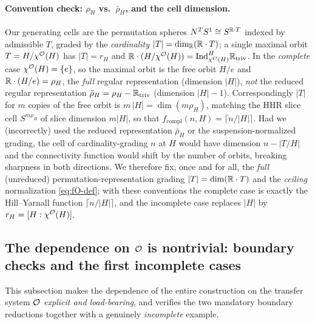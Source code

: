 \paragraph{Convention check: $\rho_H$ vs.\ $\bar\rho_H$, and the cell dimension.}
Our generating cells are the permutation spheres $N^{T}S^1\cong S^{\mathbb{R}\cdot T}$
indexed by admissible $T$, graded by the \emph{cardinality} $|T|=\dim_{\mathbb{R}}(\mathbb{R}\cdot T)$;
a single maximal orbit $T=H/\chi^{\mathcal{O}}(H)$ has $|T|=r_H$ and
$\mathbb{R}\cdot(H/\chi^{\mathcal{O}}(H))=\mathrm{Ind}_{\chi^{\mathcal{O}}(H)}^{H}\mathbb{R}_{\mathrm{triv}}$.
In the \emph{complete} case $\chi^{\mathcal{O}}(H)=\{e\}$, so the maximal orbit is the
free orbit $H/e$ and $\mathbb{R}\cdot(H/e)=\rho_H$, the \emph{full} regular
representation (dimension $|H|$), \emph{not} the reduced regular representation
$\bar\rho_H=\rho_H-\mathbb{R}_{\mathrm{triv}}$ (dimension $|H|-1$). Correspondingly
$|T|$ for $m$ copies of the free orbit is $m\,|H|=\dim(m\rho_H)$, matching the
HHR slice cell $S^{m\rho_H}$ of slice dimension $m|H|$, so that
$f_{\mathrm{compl}}(n,H)=\lceil n/|H|\rceil$. Had we (incorrectly) used the
reduced representation $\bar\rho_H$ or the suspension-normalized grading, the
cell of cardinality-grading $n$ at $H$ would have dimension $n-|T/H|$ and the
connectivity function would shift by the number of orbits, breaking sharpness in
both directions. We therefore fix, once and for all, the \emph{full}
(unreduced) permutation-representation grading $|T|=\dim(\mathbb{R}\cdot T)$ and the
\emph{ceiling} normalization \eqref{eq:fO-def}; with these conventions the
complete case is exactly the Hill--Yarnall function $\lceil n/|H|\rceil$, and the
incomplete case replaces $|H|$ by $r_H=[H:\chi^{\mathcal{O}}(H)]$.

\subsection*{The dependence on $\mathcal{O}$ is nontrivial: boundary checks and the first incomplete cases}

This subsection makes the dependence of the entire construction on the transfer
system $\mathcal{O}$ \emph{explicit and load-bearing}, and verifies the two mandatory
boundary reductions together with a genuinely \emph{incomplete} example.

